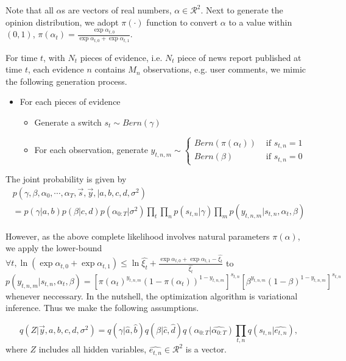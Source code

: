 \documentclass[11pt]{report}
\newcommand{\Real}{\mathcal{R}}
\begin{document}
Note that all $\alpha$s  are vectors of real numbers, $\alpha\in \Real^2$. Next to generate the opinion distribution, we adopt $\pi(\cdot)$ function to convert $\alpha$ to a value within $(0,1)$, $\pi(\alpha_t)=\frac{\exp \alpha_{t,0}}{\exp \alpha_{t,0} + \exp \alpha_{t,1}}$.

For time $t$, with $N_t$ pieces of evidence, i.e. $N_t$ piece of news report published at time $t$, each evidence $n$ contains $M_n$ observations, e.g. user comments, we mimic the following generation process. 
\begin{itemize}
\item For each pieces of evidence
\begin{itemize}
\item Generate a switch $s_t \sim Bern(\gamma)$
\item For each observation, generate $y_{t,n,m}\sim \begin{cases}
Bern(\pi(\alpha_t)) & \text{ if } s_{t,n}= 1\\ 
Bern(\beta) & \text{ if } s_{t,n}= 0 
\end{cases}$
\end{itemize}
\end{itemize}

The joint probability is given by
\begin{eqnarray*}
    p(\gamma,\beta,\alpha_0,\cdots,\alpha_T, \vec{s},\vec{y}, |a,b,c,d,\sigma^2) \\
    =    p(\gamma|a,b) p(\beta|c,d)  p(\alpha_{0:T}|\sigma^2) \prod_t \prod_ n p(s_{t,n}|\gamma) \prod_m p(y_{t,n,m}|s_{t,n},\alpha_t,\beta) 
    \end{eqnarray*}

However, as the above complete likelihood involves natural parameters $\pi(\alpha)$, we apply the lower-bound $\forall t, \ln (\exp \alpha_{t,0}+ \exp \alpha_{t,1}) \leq \ln \hat{\xi_t} + \frac{\exp \alpha_{t,0} + \exp \alpha_{t,1} -\hat{\xi_t}}{\hat{\xi_t}}$ to $p(y_{t,n,m}|s_{t,n},\alpha_t,\beta) = [\pi(\alpha_t)^{y_{t,n,m}} (1-\pi(\alpha_t))^{1-y_{t,n,m}}]^{s_{t,n}} [\beta^{y_{t,n,m}}(1-\beta)^{1-y_{t,n,m}}]^{s_{t,n}}$ whenever neccessary.
In the nutshell, the optimization algorithm is variational inference. Thus we make the following assumptions. 

\begin{equation*}
q(Z|\vec{y},a,b,c,d,\sigma^2) = q(\gamma|\hat{a},\hat{b}) q(\beta|\hat{c},\hat{d}) q(\alpha_{0:T}|\hat{\alpha_{0:T}})\prod_{t,n} q(s_{t,n}|\hat{e_{t,n}}) , 
\end{equation*}
where $Z$ includes all hidden variables, $\hat{e_{t,n}}\in \Real^2 $ is a vector.  
\end{document}
